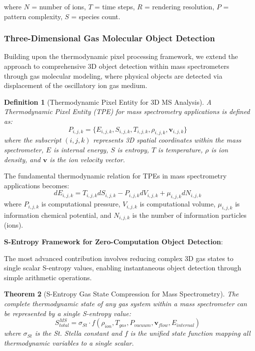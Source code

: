 \documentclass[11pt,a4paper]{article}
\newtheorem{theorem}{Theorem}[section]
\newtheorem{definition}[theorem]{Definition}
\theoremstyle{remark}
\begin{document}
where $N$ = number of ions, $T$ = time steps, $R$ = rendering resolution, $P$ = pattern complexity, $S$ = species count.

\subsubsection{Three-Dimensional Gas Molecular Object Detection}

Building upon the thermodynamic pixel processing framework, we extend the approach to comprehensive 3D object detection within mass spectrometers through gas molecular modeling, where physical objects are detected via displacement of the oscillatory ion gas medium.

\begin{definition}[Thermodynamic Pixel Entity for 3D MS Analysis]
A Thermodynamic Pixel Entity (TPE) for mass spectrometry applications is defined as:
$$P_{i,j,k} = \{E_{i,j,k}, S_{i,j,k}, T_{i,j,k}, \rho_{i,j,k}, \mathbf{v}_{i,j,k}\}$$
where the subscript $(i,j,k)$ represents 3D spatial coordinates within the mass spectrometer, $E$ is internal energy, $S$ is entropy, $T$ is temperature, $\rho$ is ion density, and $\mathbf{v}$ is the ion velocity vector.
\end{definition}

The fundamental thermodynamic relation for TPEs in mass spectrometry applications becomes:
$$dE_{i,j,k} = T_{i,j,k}dS_{i,j,k} - P_{i,j,k}dV_{i,j,k} + \mu_{i,j,k}dN_{i,j,k}$$
where $P_{i,j,k}$ is computational pressure, $V_{i,j,k}$ is computational volume, $\mu_{i,j,k}$ is information chemical potential, and $N_{i,j,k}$ is the number of information particles (ions).

\textbf{S-Entropy Framework for Zero-Computation Object Detection}:

The most advanced contribution involves reducing complex 3D gas states to single scalar S-entropy values, enabling instantaneous object detection through simple arithmetic operations.

\begin{theorem}[S-Entropy Gas State Compression for Mass Spectrometry]
The complete thermodynamic state of any gas system within a mass spectrometer can be represented by a single S-entropy value:
$$S_{total}^{MS} = \sigma_{St} \cdot f(\rho_{ion}, T_{gas}, P_{vacuum}, \mathbf{v}_{flow}, E_{internal})$$
where $\sigma_{St}$ is the St. Stella constant and $f$ is the unified state function mapping all thermodynamic variables to a single scalar.
\end{theorem}
\end{document}
